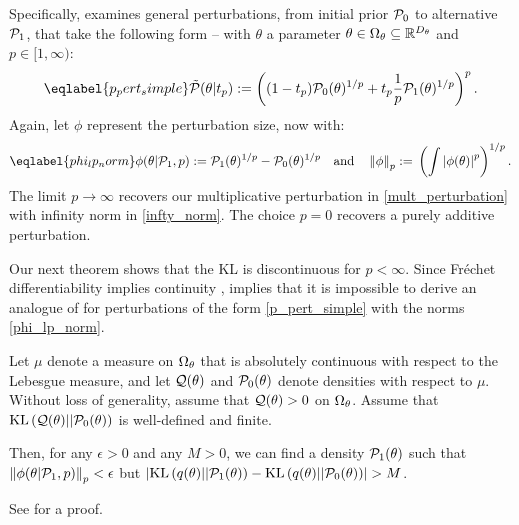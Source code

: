 Specifically, \citet{gustafson:1996:local} examines general perturbations, from initial prior
$\mathcal{P}_{0}$ to alternative $\mathcal{P}_{1}$, that take the following form -- with $\theta$ a parameter $\theta \in \Omega_{\theta} \subseteq \mathbb{R}^{{D_{\theta}}}$ and $p \in [1, \infty)$:
%
\begin{align}\eqlabel{p_pert_simple}
%
\ptil(\theta \vert \tp) :=
    \left((1 - \tp)\pbase(\theta)^{1/p} +
    \tp \frac{1}{p}\palt(\theta)^{1/p} \right)^{p}.
%
\end{align}
%
Again, let $\phi$ represent the perturbation size, now with:
%
\begin{align}\eqlabel{phi_lp_norm}
%
\phi(\theta \vert \palt, p) :={}
    \palt(\theta)^{1/p} - \pbase(\theta)^{1/p} \mathand
\norm{\phi}_p :={} \left(\int \abs{\phi(\theta)}^p \right)^{1/p}.
%
\end{align}
%
The limit $p \rightarrow \infty$ recovers our multiplicative perturbation in \eqref{mult_perturbation} 
with infinity norm in \eqref{infty_norm}. The choice $p=0$ recovers a purely additive perturbation.

Our next theorem shows that the KL is discontinuous for $p < \infty$.
Since Fr{\'e}chet differentiability implies continuity \citep[Proposition 4.8
(d)]{zeidler:2013:functional},  implies that it is
impossible to derive an analogue of  for perturbations of
the form \eqref{p_pert_simple} with the norms \eqref{phi_lp_norm}.
%
\begin{thm}
%
Let $\mu$ denote a measure on $\Omega_{\theta}$ that is absolutely continuous
with respect to the Lebesgue measure, and let $\mathcal{Q}(\theta)$ and
$\mathcal{P}_{0}(\theta)$ denote densities with respect to $\mu$.  Without loss of
generality, assume that $\mathcal{Q}(\theta) > 0$ on $\Omega_{\theta}$.  Assume that
$\mathrm{KL}\left(\mathcal{Q}(\theta) || \mathcal{P}_{0}(\theta)\right)$ is well-defined and finite.

Then, for any $\epsilon > 0$ and any $M > 0$, we can find a density
$\mathcal{P}_{1}(\theta)$ such that $\left\Vert\phi(\theta \vert \mathcal{P}_{1}, p)\right\Vert_p < \epsilon$ but
$\left|\mathrm{KL}\left(q(\theta) || \mathcal{P}_{1}(\theta)\right) - \mathrm{KL}\left(q(\theta) || \mathcal{P}_{0}(\theta)\right)\right| > M$.
%
\end{thm}
%
See  for a proof.

